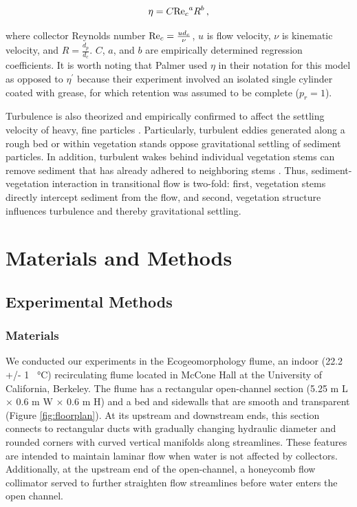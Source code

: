 \documentclass[geosciences,article,submit,moreauthors,pdftex]{Definitions/mdpi}
\begin{document}
\begin{equation}
    \eta=C{\mathrm{Re}_c}^{a}R^{b}\,,
    \label{eq:powerlaw}
\end{equation}

\noindent where collector Reynolds number $\mathrm{Re}_c=\frac{ud_c}{\nu}$, $u$ is flow velocity, $\nu$ is kinematic velocity, and $R=\frac{d_p}{d_c}$. $C$, $a$, and $b$ are empirically determined regression coefficients. It is worth noting that Palmer \cite{Palmer_2004} used $\eta$ in their notation for this model as opposed to $\eta^\prime$ because their experiment involved an isolated single cylinder coated with grease, for which retention was assumed to be complete ($p_r = 1$).

Turbulence is also theorized and empirically confirmed to affect the settling velocity of heavy, fine particles \citep{Nielsen_1993, Jacobs_2016, Wang_2018}. Particularly, turbulent eddies generated along a rough bed or within vegetation stands oppose gravitational settling of sediment particles. In addition, turbulent wakes behind individual vegetation stems can remove sediment that has already adhered to neighboring stems \cite{tinoco2016laboratory}. Thus, sediment-vegetation interaction in transitional flow is two-fold: first, vegetation stems directly intercept sediment from the flow, and second, vegetation structure influences turbulence and thereby gravitational settling.

\section{Materials and Methods}

\subsection{Experimental Methods}

\subsubsection{Materials}

We conducted our experiments in the Ecogeomorphology flume, an indoor (22.2 +/- 1 \SI{}{\celsius}) recirculating flume located in McCone Hall at the University of California, Berkeley. The flume has a rectangular open-channel section (5.25 m L $\times$ 0.6 m W $\times$ 0.6 m H) and a bed and sidewalls that are smooth and transparent (Figure \ref{fig:floorplan}). At its upstream and downstream ends, this section connects to rectangular ducts with gradually changing hydraulic diameter and rounded corners with curved vertical manifolds along streamlines. These features are intended to maintain laminar flow when water is not affected by collectors. Additionally, at the upstream end of the open-channel, a honeycomb flow collimator served to further straighten flow streamlines before water enters the open channel. 
\end{document}
